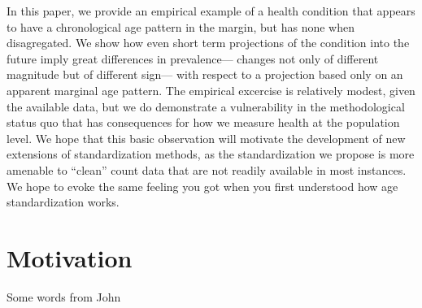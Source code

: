 \documentclass[11pt,oneside,a4paper]{article} %
\begin{document}
In this paper, we provide an empirical example of a health condition that
appears to have a chronological age pattern in the margin, but has none when
disagregated. We show how even short term projections of the
condition into the future imply great differences in prevalence--- changes not only of different magnitude but
of different sign--- with respect to a projection based only on an
apparent marginal age pattern. The empirical excercise is relatively modest,
given the available data, but we do demonstrate a vulnerability in the
methodological status quo that has consequences for how we measure health at the
population level. We hope that this basic observation will motivate the
development of new extensions of standardization methods, as the standardization
we propose is more amenable to ``clean'' count data that are not readily
available in most instances. We hope to evoke the same feeling you got when you
first understood how age standardization works.

\section*{Motivation}
Some words from John
\end{document}
